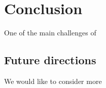 \chapter{Conclusion}


One of the main challenges of 
\section{Future directions}

We would like to consider more 